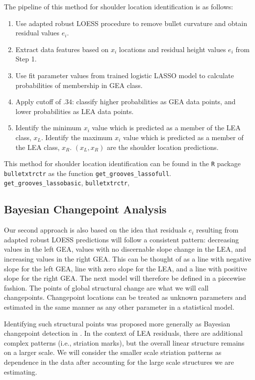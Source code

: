 \documentclass[12pt]{article}
\begin{document}
The pipeline of this method for shoulder location identification is as
follows:

\begin{enumerate}
\item Use adapted robust LOESS procedure to remove bullet curvature and obtain residual values $e_i$.
\item Extract data features based on $x_i$ locations and residual height values $e_i$ from Step 1. 
\item Use fit parameter values from trained logistic LASSO model to calculate probabilities of membership in GEA class. 
\item Apply cutoff of $.34$: classify higher probabilities as GEA data points, and lower probabilities as LEA data points.
\item Identify the minimum $x_i$ value which is predicted as a member of the LEA class, $x_{L}$. Identify the maximum $x_i$ value which is predicted as a member of the LEA class, $x_{R}$. $(x_L, x_R)$ are the shoulder location predictions.  
\end{enumerate}

This method for shoulder location identification can be found in the
\texttt{R} package \texttt{bulletxtrctr} as the function
\texttt{get\_grooves\_lassofull}. 
\texttt{get\_grooves\_lassobasic}, 
\texttt{bulletxtrctr},

\subsection{Bayesian Changepoint Analysis}

Our second approach is also based on the idea that residuals \(e_i\)
resulting from adapted robust LOESS predictions will follow a consistent
pattern: decreasing values in the left GEA, values with no discernable
slope change in the LEA, and increasing values in the right GEA. This
can be thought of as a line with negative slope for the left GEA, line
with zero slope for the LEA, and a line with positive slope for the
right GEA. The next model will therefore be defined in a piecewise
fashion. The points of global structural change are what we will call
changepoints. Changepoint locations can be treated as unknown parameters
and estimated in the same manner as any other parameter in a statistical
model.

Identifying such structural points was proposed more generally as
Bayesian changepoint detection in \citet{stephens1994}. In the context
of LEA residuals, there are additional complex patterns (i.e., striation
marks), but the overall linear structure remains on a larger scale. We
will consider the smaller scale striation patterns as dependence in the
data after accounting for the large scale structures we are estimating.
\end{document}
